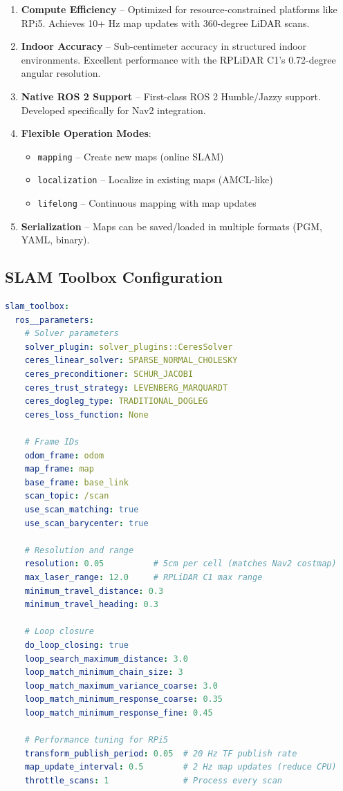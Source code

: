 \documentclass[11pt,letterpaper]{article}
\begin{document}
\begin{enumerate}
    \item \textbf{Compute Efficiency} -- Optimized for resource-constrained platforms like RPi5. Achieves 10+ Hz map updates with 360-degree LiDAR scans.

    \item \textbf{Indoor Accuracy} -- Sub-centimeter accuracy in structured indoor environments. Excellent performance with the RPLiDAR C1's 0.72-degree angular resolution.

    \item \textbf{Native ROS 2 Support} -- First-class ROS 2 Humble/Jazzy support. Developed specifically for Nav2 integration.

    \item \textbf{Flexible Operation Modes}:
    \begin{itemize}
        \item \texttt{mapping} -- Create new maps (online SLAM)
        \item \texttt{localization} -- Localize in existing maps (AMCL-like)
        \item \texttt{lifelong} -- Continuous mapping with map updates
    \end{itemize}

    \item \textbf{Serialization} -- Maps can be saved/loaded in multiple formats (PGM, YAML, binary).
\end{enumerate}

\subsection{SLAM Toolbox Configuration}

\begin{lstlisting}[language=yaml, caption=slam\_toolbox\_params.yaml]
slam_toolbox:
  ros__parameters:
    # Solver parameters
    solver_plugin: solver_plugins::CeresSolver
    ceres_linear_solver: SPARSE_NORMAL_CHOLESKY
    ceres_preconditioner: SCHUR_JACOBI
    ceres_trust_strategy: LEVENBERG_MARQUARDT
    ceres_dogleg_type: TRADITIONAL_DOGLEG
    ceres_loss_function: None

    # Frame IDs
    odom_frame: odom
    map_frame: map
    base_frame: base_link
    scan_topic: /scan
    use_scan_matching: true
    use_scan_barycenter: true

    # Resolution and range
    resolution: 0.05          # 5cm per cell (matches Nav2 costmap)
    max_laser_range: 12.0     # RPLiDAR C1 max range
    minimum_travel_distance: 0.3
    minimum_travel_heading: 0.3

    # Loop closure
    do_loop_closing: true
    loop_search_maximum_distance: 3.0
    loop_match_minimum_chain_size: 3
    loop_match_maximum_variance_coarse: 3.0
    loop_match_minimum_response_coarse: 0.35
    loop_match_minimum_response_fine: 0.45

    # Performance tuning for RPi5
    transform_publish_period: 0.05  # 20 Hz TF publish rate
    map_update_interval: 0.5        # 2 Hz map updates (reduce CPU)
    throttle_scans: 1               # Process every scan
\end{lstlisting}
\end{document}

